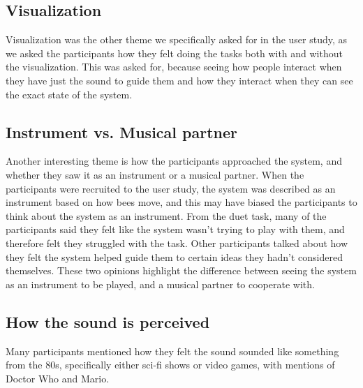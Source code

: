 \documentclass[a4paper,english]{report}
\begin{document}
	\subsection{Visualization}
	Visualization was the other theme we specifically asked for in the user study, as we asked the participants how they felt doing the tasks both with and without the visualization. This was asked for, because seeing how people interact when they have just the sound to guide them and how they interact when they can see the exact state of the system. 
	\subsection{Instrument vs. Musical partner}
	Another interesting theme is how the participants approached the system, and whether they saw it as an instrument or a musical partner. When the participants were recruited to the user study, the system was described as an instrument based on how bees move, and this may have biased the participants to think about the system as an instrument. From the duet task, many of the participants said they felt like the system wasn't trying to play with them, and therefore felt they struggled with the task. Other participants talked about how they felt the system helped guide them to certain ideas they hadn't considered themselves. These two opinions highlight the difference between seeing the system as an instrument to be played, and a musical partner to cooperate with. 
	\subsection{How the sound is perceived}
	Many participants mentioned how they felt the sound sounded like something from the 80s, specifically either sci-fi shows or video games, with mentions of Doctor Who and Mario.	
	
	\fi
\end{document}
